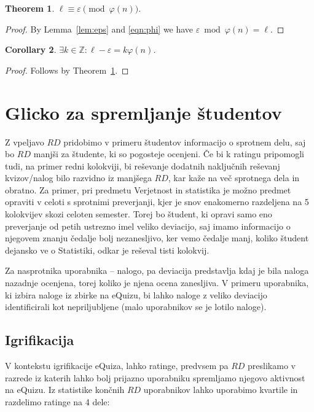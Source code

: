 \documentclass{IEEEtran}
\makeatletter
\newcommand{\Z}{\ensuremath{\mathbb Z}}
\let\old@subsection\subsection
\renewcommand{\subsection}[1]{\bigskip\old@subsection{#1}\@afterindentfalse\@afterheading}
\newtheorem{theorem}{Theorem}[section]
\newtheorem{corollary}[theorem]{Corollary}
\makeatother
\begin{document}
\begin{theorem} \label{thm:equiv}
$\ell \equiv \varepsilon \pmod{\varphi(n)}$.
\end{theorem}

\begin{proof}
By Lemma~\ref{lem:eps} and \eqref{eqn:phi} we have $\varepsilon \bmod{\varphi(n)} = \ell$.
\end{proof}

\begin{corollary} \label{cor:mult}
$\exists k \in \Z: \ell - \varepsilon = k \varphi(n)$.
\end{corollary}

\begin{proof}
Follows by Theorem~\ref{thm:equiv}.
\end{proof}
\fi

\newpage
\section{Glicko za spremljanje študentov}
Z vpeljavo $RD$ pridobimo v primeru študentov informacijo o sprotnem delu, saj bo $RD$ manjši za študente, ki so pogosteje ocenjeni. Če bi k ratingu pripomogli tudi, na primer redni kolokviji, bi reševanje dodatnih  naključnih reševanj kvizov/nalog bilo razvidno iz manjšega $RD$, kar kaže na več sprotnega dela in obratno. Za primer, pri predmetu Verjetnost in statistika je možno predmet opraviti v celoti s sprotnimi preverjanji, kjer je snov enakomerno razdeljena na 5 kolokvijev skozi celoten semester. Torej bo študent, ki opravi samo eno preverjanje od petih ustrezno imel veliko deviacijo, saj imamo informacijo o njegovem znanju čedalje bolj nezanesljivo, ker vemo čedalje manj, koliko študent dejansko ve o Statistiki, odkar je reševal tisti kolokvij.

Za nasprotnika uporabnika – nalogo, pa deviacija predstavlja kdaj je bila naloga nazadnje ocenjena, torej koliko je njena ocena zanesljiva. V primeru uporabnika, ki izbira naloge iz zbirke na eQuizu, bi lahko naloge z veliko deviacijo identificirali kot nepriljubljene (malo uporabnikov se je lotilo naloge).


\newpage
\subsection{Igrifikacija}
V kontekstu igrifikacije eQuiza, lahko ratinge, predvsem pa $RD$ preslikamo v razrede iz katerih lahko bolj prijazno uporabniku spremljamo njegovo aktivnost na eQuizu. Iz statistike končnih $RD$ uporabnikov lahko uporabimo kvartile in razdelimo ratinge na 4 dele:
\end{document}
